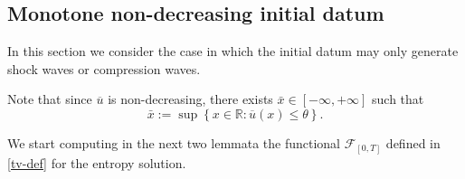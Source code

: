 \documentclass[a4paper, 10pt, final]{article}
\newcommand{\R}{\mathbb{R}} \newcommand{\N}{\mathbb{N}}
\begin{document}
\subsection{Monotone non-decreasing initial datum}
In this section we   consider the case in which the initial datum may only generate shock waves or compression waves. 

 

 
Note that since $\overline u$ is non-decreasing, there exists $\bar x\in[-\infty, +\infty]$   such that  
\begin{equation}\label{xbar} \bar x:= \sup\left\{x \in \R: \overline u(x) \le \theta\right\}.\end{equation}
  
We  start computing in the next two lemmata the functional $\mathcal{F}_{[0,T]}$ defined in \eqref{tv-def} 
for the entropy solution. 
 
\end{document}
